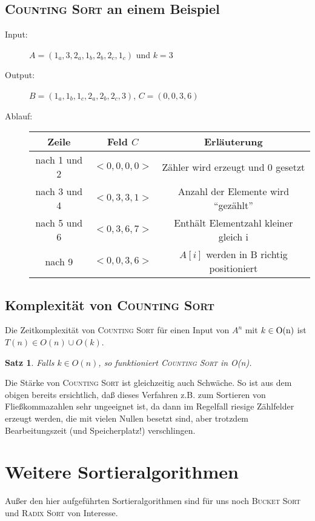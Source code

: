 \documentclass[ngerman,draft,parskip=half*,twoside]{scrreprt}
\theoremstyle{break}
\newtheorem{satz}{Satz}
\begin{document}
  \subsection{\textsc{Counting Sort} an einem Beispiel}

  \begin{description}
    \item[Input:] $A = ( 1_a , 3 , 2_a , 1_b , 2_b , 2_c , 1_c )$ und $k = 3$
    \item[Output:] $B = ( 1_a , 1_b , 1_c , 2_a , 2_b , 2_c , 3 )$, $C = ( 0, 0, 3, 6 )$
    \item[Ablauf:]
    \begin{tabular}[t]{*{3}{c}}
      Zeile & Feld $C$ & Erläuterung\\
      \hline
      nach 1 und 2 & $< 0, 0, 0, 0 >$ & Zähler wird erzeugt und 0 gesetzt\\
      nach 3 und 4 & $< 0, 3, 3, 1>$   & Anzahl der Elemente wird ``gezählt''\\
      nach 5 und 6 & $< 0, 3, 6, 7>$   & Enthält Elementzahl kleiner gleich i\\
      nach 9       & $< 0, 0, 3, 6>$   & $A[ i ]$ werden in B richtig positioniert\\
    \end{tabular}
    
    
  \end{description}

  \subsection{Komplexität von \textsc{Counting Sort}}
   Die Zeitkomplexität von \textsc{Counting Sort} für einen Input von $A^n$ mit 
   \(k \in \textup{O}(\textup{n})\) ist 
   \\ $T( n )  \in  O( n ) \cup O( k )$.
  \begin{satz}
   Falls $k \in  O( n )$, so funktioniert \textsc{Counting Sort} in O(n).
  \end{satz}

Die Stärke von \textsc{Counting Sort} ist gleichzeitig auch Schwäche. So ist aus dem obigen bereits ersichtlich, daß dieses Verfahren
z.B. zum Sortieren von Fließkommazahlen sehr ungeeignet ist, da dann im Regelfall riesige Zählfelder erzeugt werden, die mit vielen
Nullen besetzt sind, aber trotzdem Bearbeitungszeit (und Speicherplatz!) verschlingen.

\section{Weitere Sortieralgorithmen}
  Außer den hier aufgeführten Sortieralgorithmen sind für uns noch \textsc{Bucket Sort} und
  \textsc{Radix Sort} von Interesse.
\end{document}
